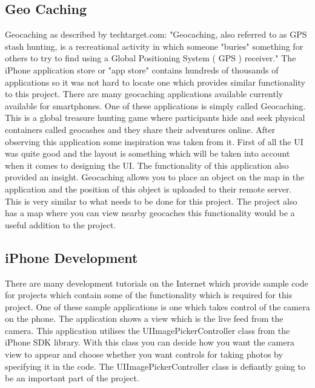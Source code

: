 \documentclass[12pt]{article}
\begin{document}

\subsection{Geo Caching}

Geocaching as described by techtarget.com: "Geocaching, also referred to as GPS stash hunting, is a recreational activity in which someone "buries" something for others to try to find using a Global Positioning System ( GPS ) receiver."
The iPhone application store or "app store" contains hundreds of thousands of applications so it was not hard to locate one which provides similar functionality to this project.
There are many geocaching applications available currently available for smartphones.
One of these applications is simply called Geocaching. This is a global treasure hunting game where participants hide and seek physical containers called geocashes and they share their adventures online.
After observing this application some inspiration was taken from it. First of all the UI was quite good and the layout is something which will be taken into account when it comes to designing the UI. The functionality of this application also provided an insight. Geocaching allows you to place an object on the map in the application and the position of this object is uploaded to their remote server. This is very similar to what needs to be done for this project. The project also has a map where you can view nearby geocaches this functionality would be a useful addition to the project.




\subsection{iPhone Development}
There are many development tutorials on the Internet which provide sample code for projects which contain some of the functionality which is required for this project. One of these sample applications is one which takes control of the camera on the phone. The application shows a view which is the live feed from the camera. This application utilises the UIImagePickerController class from the iPhone SDK library. With this class you can decide how you want the camera view to appear and choose whether you want controls for taking photos by specifying it in the code. The UIImagePickerController class is defiantly going to be an important part of the project.
\end{document}
